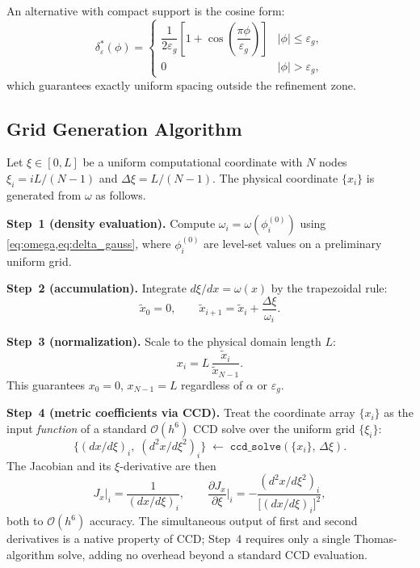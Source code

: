 \documentclass[10pt,a4paper,twocolumn]{article}
\newcommand{\pd}[2]{\dfrac{\partial #1}{\partial #2}}
\newcommand{\Ord}[1]{\mathcal{O}(#1)}
\newcommand{\eps}{\varepsilon}
\begin{document}
An alternative with compact support is the cosine form:
\begin{equation}
  \delta_\eps^*(\phi) = \begin{cases}
    \dfrac{1}{2\eps_g}\!\left[1 + \cos\!\left(\dfrac{\pi\phi}{\eps_g}\right)\right]
      & |\phi| \le \eps_g, \\[6pt]
    0 & |\phi| > \eps_g,
  \end{cases}
  \label{eq:delta_cos}
\end{equation}
which guarantees exactly uniform spacing outside the refinement zone.

\subsection{Grid Generation Algorithm}
\label{sec:gen}

Let $\xi \in [0, L]$ be a uniform computational coordinate with $N$ nodes
$\xi_i = iL/(N-1)$ and $\Delta\xi = L/(N-1)$. The physical coordinate
$\{x_i\}$ is generated from $\omega$ as follows.

\textbf{Step~1 (density evaluation).}
Compute $\omega_i = \omega(\phi_i^{(0)})$ using \cref{eq:omega,eq:delta_gauss},
where $\phi_i^{(0)}$ are level-set values on a preliminary uniform grid.

\textbf{Step~2 (accumulation).}
Integrate $d\xi/dx = \omega(x)$ by the trapezoidal rule:
\begin{equation}
  \tilde{x}_0 = 0,\qquad
  \tilde{x}_{i+1} = \tilde{x}_i + \frac{\Delta\xi}{\omega_i}.
  \label{eq:accum}
\end{equation}

\textbf{Step~3 (normalization).}
Scale to the physical domain length $L$:
\begin{equation}
  x_i = L\,\frac{\tilde{x}_i}{\tilde{x}_{N-1}}.
  \label{eq:normalize}
\end{equation}
This guarantees $x_0 = 0$, $x_{N-1} = L$ regardless of $\alpha$ or $\eps_g$.

\textbf{Step~4 (metric coefficients via CCD).}
Treat the coordinate array $\{x_i\}$ as the input \emph{function} of a
standard $\Ord{h^6}$ CCD solve over the uniform grid $\{\xi_i\}$:
\begin{equation}
  \bigl\{(dx/d\xi)_i,\;(d^2x/d\xi^2)_i\bigr\}
  \;\leftarrow\; \texttt{ccd\_solve}\!\left(\{x_i\},\,\Delta\xi\right).
  \label{eq:ccd_metric}
\end{equation}
The Jacobian and its $\xi$-derivative are then
\begin{equation}
  J_x\big|_i = \frac{1}{(dx/d\xi)_i},\qquad
  \pd{J_x}{\xi}\bigg|_i = -\frac{(d^2x/d\xi^2)_i}{\bigl[(dx/d\xi)_i\bigr]^2},
  \label{eq:Jx}
\end{equation}
both to $\Ord{h^6}$ accuracy. The simultaneous output of first and second
derivatives is a native property of CCD; Step~4 requires only a single
Thomas-algorithm solve, adding no overhead beyond a standard CCD evaluation.
\end{document}
